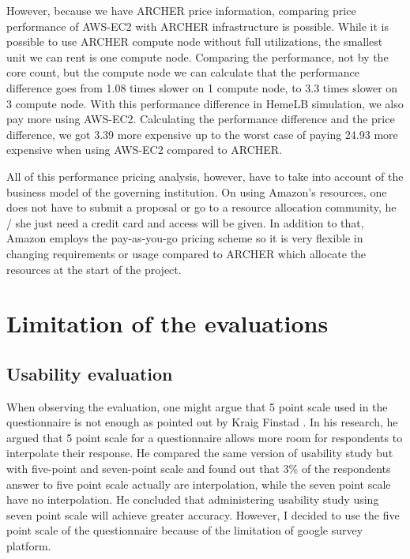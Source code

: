 However, because we have ARCHER price information, comparing price performance of AWS-EC2 with ARCHER infrastructure is possible. While it is possible to use ARCHER compute node without full utilizations, the smallest unit we can rent is one compute node. Comparing the performance, not by the core count, but the compute node we can calculate that the performance difference goes from 1.08 times slower on 1 compute node, to 3.3 times slower on 3 compute node. With this performance difference in HemeLB simulation, we also pay more using AWS-EC2. Calculating the performance difference and the price difference, we got 3.39 more expensive up to the worst case of paying 24.93 more expensive when using AWS-EC2 compared to ARCHER.

All of this performance pricing analysis, however, have to take into account of the business model of the governing institution. On using Amazon's resources, one does not have to submit a proposal or go to a resource allocation community, he / she just need a credit card and access will be given. In addition to that, Amazon employs the pay-as-you-go pricing scheme so it is very flexible in changing requirements or usage compared to ARCHER which allocate the resources at the start of the project. 


\section {Limitation of the evaluations}

\subsection{Usability evaluation}

When observing the evaluation, one might argue that 5 point scale used in the questionnaire is not enough as pointed out by Kraig Finstad \cite{finstad2010response}. In his research, he argued that 5 point scale for a questionnaire allows more room for respondents to interpolate their response. He compared the same version of usability study but with five-point and seven-point scale and found out that 3\% of the respondents answer to five point scale actually are interpolation, while the seven point scale have no interpolation. He concluded that administering usability study using seven point scale will achieve greater accuracy. However, I decided to use the five point scale of the questionnaire because of the limitation of google survey platform. 

